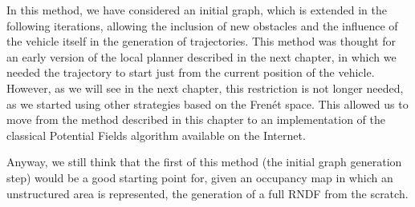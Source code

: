 In this method, we have considered an initial graph, which is extended in the following iterations, allowing the inclusion of new obstacles and the influence of the vehicle itself in the generation of trajectories. This method was thought for an early version of the local planner described in the next chapter, in which we needed the trajectory to start just from the current position of the vehicle. However, as we will see in the next chapter, this restriction is not longer needed, as we started using other strategies based on the Frenét space. This allowed us to move from the method described in this chapter to an implementation of the classical Potential Fields algorithm available on the Internet. 

Anyway, we still think that the first of this method (the initial graph generation step) would be a good starting point for, given an occupancy map in which an unstructured area is represented, the generation of a full \ac{RNDF} from the scratch.
